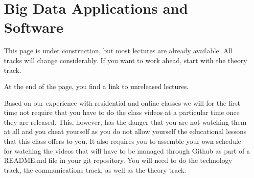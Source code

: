 

\section{Big Data Applications and Software}
\label{s:bd-software}

\FILENAME

\begin{WARNING}
This page is under construction, but most lectures are
already available. All tracks will change considerably. If you want to
work ahead, start with the theory track.
\end{WARNING}

\begin{NOTE}
At the end of the page, you find a link to unreleased
lectures.
\end{NOTE}

Based on our experience with residential and online classes we will for
the first time not require that you have to do the class videos at a
particular time once they are released. This, however, has the danger
that you are not watching them at all and you cheat yourself as you do
not allow yourself the educational lessons that this class offers to
you. It also requires you to assemble your own schedule for watching the
videos that will have to be managed through Github as part of a
README.md file in your git repository. You will need to do the
technology track, the communications track, as well as the theory track.


